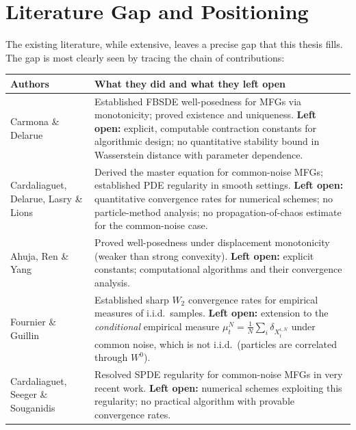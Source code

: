 \section{Literature Gap and Positioning}
\label{sec:gap}

The existing literature, while extensive, leaves a precise gap that this thesis
fills. The gap is most clearly seen by tracing the chain of contributions:

\begin{center}
\begin{tabular}{p{3.5cm}p{8cm}}
\toprule
\textbf{Authors} & \textbf{What they did and what they left open} \\
\midrule
Carmona \& Delarue \citep{carmonadelarue2018} &
    Established FBSDE well-posedness for MFGs via monotonicity; proved existence
    and uniqueness. \textbf{Left open:} explicit, computable contraction constants
    for algorithmic design; no quantitative stability bound in Wasserstein distance
    with parameter dependence. \\[4pt]
Cardaliaguet, Delarue, Lasry \& Lions \citep{cardaliaguetetal2019} &
    Derived the master equation for common-noise MFGs; established PDE regularity
    in smooth settings. \textbf{Left open:} quantitative convergence rates for
    numerical schemes; no particle-method analysis; no propagation-of-chaos
    estimate for the common-noise case. \\[4pt]
Ahuja, Ren \& Yang \citep{ahujarenyang2019} &
    Proved well-posedness under displacement monotonicity (weaker than strong
    convexity). \textbf{Left open:} explicit constants; computational algorithms
    and their convergence analysis. \\[4pt]
Fournier \& Guillin \citep{fournierguillin2015} &
    Established sharp $W_2$ convergence rates for empirical measures of i.i.d.\
    samples. \textbf{Left open:} extension to the \emph{conditional} empirical
    measure $\mu_t^N = \frac{1}{N}\sum_i \delta_{X_t^{i,N}}$ under common noise,
    which is not i.i.d.\ (particles are correlated through $W^0$). \\[4pt]
Cardaliaguet, Seeger \& Souganidis \citep{cardaliaguetseegersouganidis2025} &
    Resolved SPDE regularity for common-noise MFGs in very recent work.
    \textbf{Left open:} numerical schemes exploiting this regularity; no
    practical algorithm with provable convergence rates. \\
\bottomrule
\end{tabular}
\end{center}

